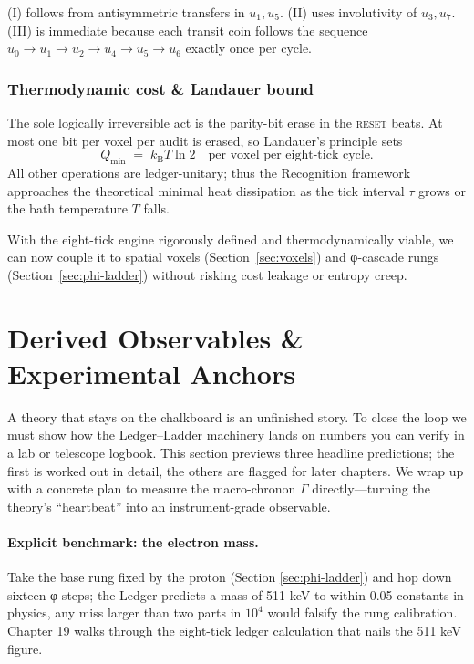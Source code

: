 \documentclass[11pt,oneside]{book}
\begin{document}
(I) follows from antisymmetric transfers in \(u_{1},u_{5}\).  
(II) uses involutivity of \(u_{3},u_{7}\).  
(III) is immediate because each transit coin follows the sequence
\(u_{0}\!\to\!u_{1}\!\to\!u_{2}\!\to\!u_{4}\!\to\!u_{5}\!\to\!u_{6}\) exactly
once per cycle.

\subsubsection{Thermodynamic cost \& Landauer bound}
\label{subsubsec:landauer}
The sole logically irreversible act is the parity-bit erase in the
\textsc{reset} beats.  
At most one bit per voxel per audit is erased, so Landauer’s principle sets
\[
  Q_{\min}
  \;=\;
  k_{\text{B}}T\ln 2
  \quad
  \text{per voxel per eight-tick cycle}.
\]
All other operations are ledger-unitary; thus the Recognition framework
approaches the theoretical minimal heat dissipation as the tick interval
\(\tau\) grows or the bath temperature \(T\) falls.

\medskip
With the eight-tick engine rigorously defined and thermodynamically viable,
we can now couple it to spatial voxels
(Section~\ref{sec:voxels}) and φ-cascade rungs
(Section~\ref{sec:phi-ladder}) without risking cost leakage or entropy creep.


\section{Derived Observables \& Experimental Anchors}
\label{sec:derived-observables}


A theory that stays on the chalkboard is an unfinished story.  
To close the loop we must show how the Ledger–Ladder machinery lands on
numbers you can verify in a lab or telescope logbook.  This section previews
three headline predictions; the first is worked out in detail, the others are
flagged for later chapters.  We wrap up with a concrete plan to measure the
macro-chronon \(\Gamma\) directly—turning the theory’s “heartbeat” into an
instrument-grade observable.

\paragraph{Explicit benchmark: the electron mass.}
Take the base rung fixed by the proton (Section \ref{sec:phi-ladder}) and hop
down sixteen φ-steps; the Ledger predicts a mass of 511 keV to within
0.05 %
constants in physics, any miss larger than two parts in \(10^{4}\) would
falsify the rung calibration.  Chapter 19 walks through the eight-tick ledger
calculation that nails the 511 keV figure.
\end{document}
